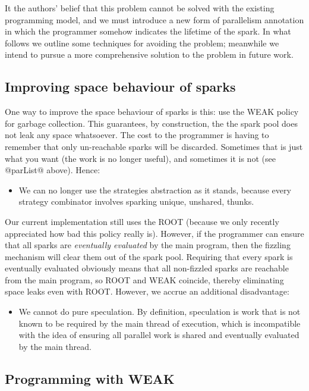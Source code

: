 \documentclass[twocolumn,9pt]{sigplanconf}
\begin{document}
It the authors' belief that this problem cannot be solved with the
existing programming model, and we must introduce a new form of
parallelism annotation in which the programmer somehow indicates the
lifetime of the spark.  In what follows we outline some techniques for
avoiding the problem; meanwhile we intend to pursue a more
comprehensive solution to the problem in future work.

\subsection{Improving space behaviour of sparks}

One way to improve the space behaviour of sparks is this:
use the WEAK policy for garbage collection.  This guarantees,
by construction, the the spark pool does not leak any space 
whatsoever.  The cost to the programmer is having to remember that
only un-reachable sparks will be discarded.  Sometimes that is just
what you want (the work is no longer useful), and sometimes it is not
(see @parList@ above).  Hence:
\begin{itemize}
\item We can no longer use the strategies abstraction as it stands,
  because every strategy combinator involves sparking unique,
  unshared, thunks.
\end{itemize}
Our current implementation still uses the ROOT (because we only
recently appreciated how bad this policy really is).  However, if 
the programmer can
ensure that all sparks are \emph{eventually evaluated} by the main
program, then the fizzling mechanism will clear them out of the 
spark pool.  Requiring that every spark is eventually evaluated obviously
means that all non-fizzled sparks are reachable from the main program,
so ROOT and WEAK coincide, thereby eliminating space leaks
even with ROOT.  However, we accrue an additional disadvantage:
\begin{itemize}
\item We cannot do pure speculation.  By definition, speculation is
  work that is not known to be required by the main thread of
  execution, which is incompatible with the idea of ensuring all
  parallel work is shared and eventually evaluated by the main thread.
\end{itemize}

\subsection{Programming with WEAK}
\label{s:par-space-leak-workaround}
\end{document}
